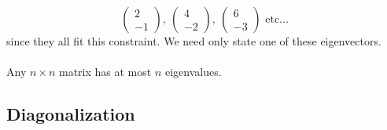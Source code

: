 \documentclass{scrartcl}
\begin{document}
\begin{equation}
\begin{pmatrix}
2 \\ -1
\end{pmatrix} , \ 
\begin{pmatrix}
4 \\ -2
\end{pmatrix} , \
\begin{pmatrix}
6 \\ -3
\end{pmatrix} \textrm{ etc...}
\end{equation}
since they all fit this constraint. We need only state one of these eigenvectors.
\\\\
Any $ n \times n $ matrix has at most $ n $ eigenvalues.

\subsection{Diagonalization}
\end{document}
